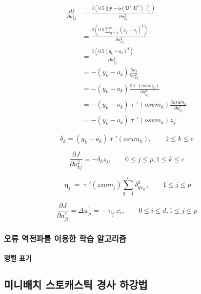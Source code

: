 \documentclass [12pt] {oblivoir}
\let\oldsubsubsection=\subsubsection
\renewcommand{\subsubsection}
{
  \filbreak
  \oldsubsubsection
}
\begin{document}
\begin{align*}
  \frac{\partial J}{\partial u_{kj}^{2}} &= \frac{\partial(0.5 \lVert \mathbf{y} - \mathbf{o}(\mathbf{U}^{1}, \mathbf{U}^{2}) \rVert_{2}^{2})}{\partial u_{kj}^{2}} \\
  &= \frac{\partial(0.5\sum_{q=1}^{c}(y_{q} - o_{q})^{2})}{\partial u_{kj}^{2}} \\
  &= \frac{\partial(0.5(y_{k} - o_{k})^{2})}{\partial u_{kj}^{2}} \\
  &= -(y_{k} - o_{k})\frac{\partial o_{k}}{\partial u_{kj}^{2}} \\
  &= -(y_{k} - o_{k})\frac{\partial\uptau(osum_{k})}{\partial u_{kj}^{2}} \\
  &= -(y_{k} - o_{k})\uptau'(osum_{k})\frac{\partial osum_{k}}{\partial u_{kj}^{2}} \\
  &= -(y_{k} - o_{k})\uptau'(osum_{k})z_{j}
\end{align*}

\begin{equation} \tag{3.22}
  \delta_{k} = (y_{k} - o_{k})\uptau'(osum_{k}), \qquad 1 \le k \le c
\end{equation}

\begin{equation} \tag{3.23}
  \frac{\partial J}{\partial u_{kj}^{2}} = -\delta_{k}z_{j}, \qquad 0 \le j \le p, 1 \le k \le c
\end{equation}

\begin{equation} \tag{3.24}
  \upeta_{j} = \uptau'(zsum_{j})\sum_{q=1}^{c}\delta_{qu_{qj}}^{2}, \qquad 1 \le j \le p
\end{equation}

\begin{equation} \tag{3.25}
  \frac{\partial J}{\partial u_{ji}^{1}} = \Delta u_{ji}^{1} = -\upeta_{j}x_{i}, \qquad 0 \le i \le d, 1 \le j \le p
\end{equation}

\subsubsection{오류 역전파를 이용한 학습 알고리즘}

\paragraph*{행렬 표기}\mbox{}

\subsection{미니배치 스토캐스틱 경사 하강법}
\end{document}
